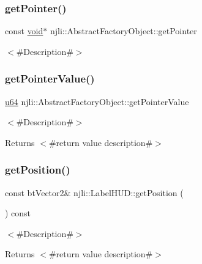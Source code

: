\subsubsection{\texorpdfstring{get\+Pointer()}{getPointer()}}
{\footnotesize\ttfamily const \mbox{\hyperlink{_thread_8h_af1e856da2e658414cb2456cb6f7ebc66}{void}}$\ast$ njli\+::\+Abstract\+Factory\+Object\+::get\+Pointer}

$<$\#\+Description\#$>$ \mbox{\label{classnjli_1_1_label_h_u_d_a4ffddf141a426a5a07d0ac19f1913811}} 
\subsubsection{\texorpdfstring{get\+Pointer\+Value()}{getPointerValue()}}
{\footnotesize\ttfamily \mbox{\hyperlink{_util_8h_ad758b7a5c3f18ed79d2fcd23d9f16357}{u64}} njli\+::\+Abstract\+Factory\+Object\+::get\+Pointer\+Value}

$<$\#\+Description\#$>$

\begin{DoxyReturn}{Returns}
$<$\#return value description\#$>$ 
\end{DoxyReturn}
\mbox{\label{classnjli_1_1_label_h_u_d_a55a3f0c4c64bf7e0a5c510500f3288fe}} 
\subsubsection{\texorpdfstring{get\+Position()}{getPosition()}}
{\footnotesize\ttfamily const bt\+Vector2\& njli\+::\+Label\+H\+U\+D\+::get\+Position (\begin{DoxyParamCaption}{ }\end{DoxyParamCaption}) const}

$<$\#\+Description\#$>$

\begin{DoxyReturn}{Returns}
$<$\#return value description\#$>$ 
\end{DoxyReturn}
\mbox{\label{classnjli_1_1_label_h_u_d_a600c970bbab43aebdd7d72e75c9519df}} 
